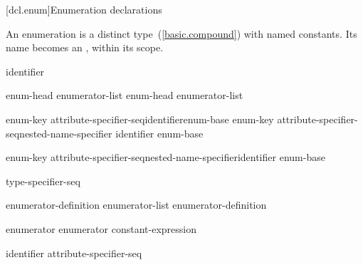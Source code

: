 [dcl.enum]{Enumeration declarations}%
%
%

\pnum
An enumeration is a distinct type~(\ref{basic.compound}) with named
constants. Its name becomes an , within its scope.

\begin{bnf}
\br
    identifier
\end{bnf}

\begin{bnf}
\br
    enum-head \terminal{\{} enumerator-list\opt{} \terminal{\}}\br
    enum-head \terminal{\{} enumerator-list \terminal{, \}}
\end{bnf}

\begin{bnf}
\br
    enum-key attribute-specifier-seq\opt identifier\opt enum-base\opt\br
    enum-key attribute-specifier-seq\opt nested-name-specifier identifier\br
\hspace*{\bnfindentinc}enum-base\opt
\end{bnf}

\begin{bnf}
\br
    enum-key attribute-specifier-seq\opt nested-name-specifier\opt identifier enum-base\opt{} \terminal{;}
\end{bnf}

\begin{bnf}
\br
    \br
    \br
\end{bnf}

\begin{bnf}
\br
    \terminal{:} type-specifier-seq
\end{bnf}

\begin{bnf}
\br
    enumerator-definition\br
    enumerator-list \terminal{,} enumerator-definition
\end{bnf}

\begin{bnf}
\br
    enumerator\br
    enumerator \terminal{=} constant-expression
\end{bnf}

\begin{bnf}
\br
    identifier attribute-specifier-seq\opt
\end{bnf}

